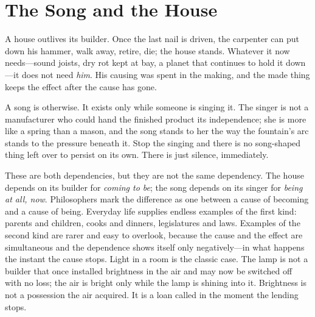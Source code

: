 \section{The Song and the House}

A house outlives its builder. Once the last nail is driven, the carpenter can put down his hammer, walk away, retire, die; the house stands. Whatever it now needs---sound joists, dry rot kept at bay, a planet that continues to hold it down---it does not need \emph{him}. His causing was spent in the making, and the made thing keeps the effect after the cause has gone.

A song is otherwise. It exists only while someone is singing it. The singer is not a manufacturer who could hand the finished product its independence; she is more like a spring than a mason, and the song stands to her the way the fountain's arc stands to the pressure beneath it. Stop the singing and there is no song-shaped thing left over to persist on its own. There is just silence, immediately.

These are both dependencies, but they are not the same dependency. The house depends on its builder for \emph{coming to be}; the song depends on its singer for \emph{being at all, now}. Philosophers mark the difference as one between a cause of becoming and a cause of being. Everyday life supplies endless examples of the first kind: parents and children, cooks and dinners, legislatures and laws. Examples of the second kind are rarer and easy to overlook, because the cause and the effect are simultaneous and the dependence shows itself only negatively---in what happens the instant the cause stops. Light in a room is the classic case. The lamp is not a builder that once installed brightness in the air and may now be switched off with no loss; the air is bright only while the lamp is shining into it. Brightness is not a possession the air acquired. It is a loan called in the moment the lending stops.

